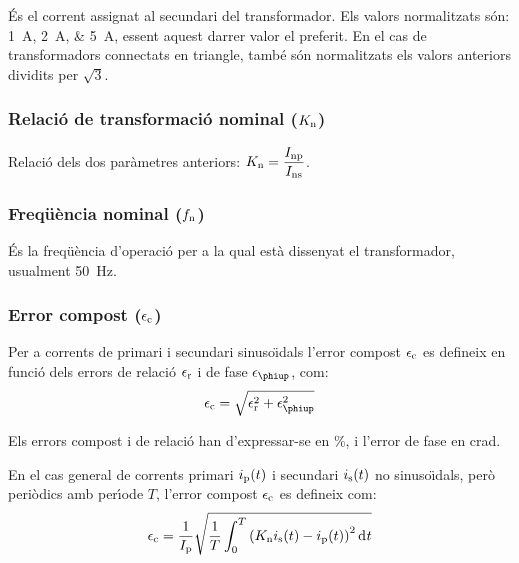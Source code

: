  \'{E}s el corrent assignat al
secundari del transformador. Els valors normalitzats
s\'{o}n: \SIlist{1;2;5}{A}, essent aquest darrer valor el
preferit. En el cas de transformadors connectats en triangle, tamb\'{e} s\'{o}n normalitzats els valors anteriors dividits per $ \sqrt{3}$.

\subsubsection{Relaci\'{o} de transformaci\'{o} nominal ($K_\mathrm{n}$)}

Relaci\'{o} dels dos  par\`{a}metres anteriors: $K_\mathrm{n} = \dfrac{I_\mathrm{np}}{I_\mathrm{ns}}$.

\subsubsection{Freq\"{u}\`{e}ncia nominal ($f_\mathrm{n}$)}

 \'{E}s la freq\"{u}\`{e}ncia d'operaci\'{o} per a la qual    est\`{a} dissenyat el transformador, usualment \SI{50}{Hz}.

\subsubsection{Error compost ($\epsilon_\mathrm{c}$)}

Per a corrents de primari i secundari sinuso\"{\i}dals l'error compost $\epsilon_\mathrm{c}$ es defineix  en funci\'{o} dels errors de relaci\'{o} $\epsilon_\mathrm{r}$ i de fase  $\epsilon\ped{\phiup}$, com:
\begin{equation}
    \epsilon\ped{c} = \sqrt{\epsilon\ped{r}^2 +  \epsilon\ped{\phiup}^2}
\end{equation}

Els errors compost i de relaci\'{o} han d'expressar-se en \%, i l'error
de fase en crad.

En el cas general de corrents primari $i_\mathrm{p}(t)$ i secundari $i_\mathrm{s}(t)$ no sinuso\"{\i}dals, per\`{o} peri\`{o}dics amb per\'{\i}ode $T$, l'error compost $\epsilon_\mathrm{c}$ es defineix com:
\begin{equation}
    \epsilon\ped{c} = \frac{1}{I\ped{p}} \sqrt{\frac{1}{T} \int_0^T \left(K\ped{n} i\ped{s}(t) - i\ped{p}(t)\right)^2 \diff t}
\end{equation}

